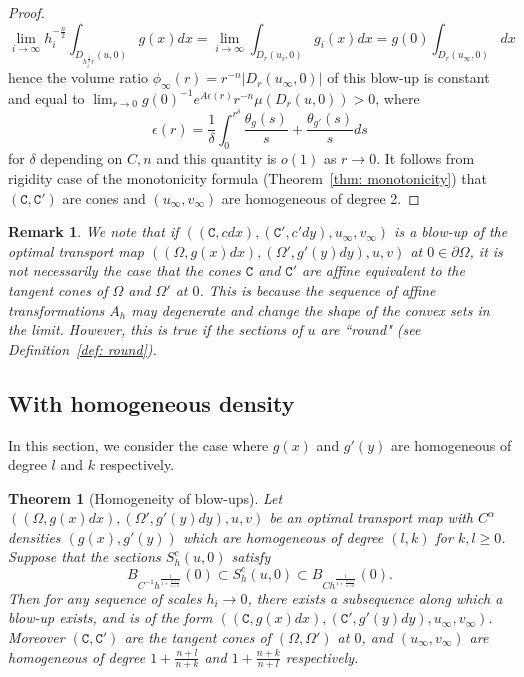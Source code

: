 \documentclass[12pt,reqno]{amsart}
\newtheorem{remark}{Remark}[section]
\newtheorem{theorem}{Theorem}[section]
\numberwithin{equation}{section}
\begin{document}
\begin{proof}
        \[\lim_{i\to \infty}h_i^{-\frac n 2}\int_{D_{h_i^{\frac 1 2}r}(u, 0)}g(x)dx =\lim_{i\to \infty}\int_{D_r(u_i, 0)}g_i(x)dx = g(0)\int_{D_r(u_{\infty}, 0)}dx\]
        hence the volume ratio $\phi_{\infty}(r) = r^{-n}|D_r(u_{\infty}, 0)|$ of this blow-up is constant and equal to $\lim_{r\to 0}g(0)^{-1}e^{A\epsilon (r)}r^{-n}\mu(D_r(u, 0))>0$, where 
        \[
        \epsilon(r) = \frac{1}{\delta}\int_{0}^{r^{\delta}} \frac{\theta_g(s)}{s} +\frac{\theta_{g'}(s)}{s}  ds
        \]
        for $\delta$ depending on $C, n$ and this quantity is $o(1)$ as $r\rightarrow 0$.
        It follows from rigidity case of the monotonicity formula (Theorem~\ref{thm: monotonicity}) that $(\mathtt C, \mathtt C')$ are cones and $(u_{\infty}, v_{\infty})$ are homogeneous of degree 2. 
        \end{proof}

        \begin{remark}
            We note that if $((\mathtt C,cdx), (\mathtt C', c'dy), u_{\infty}, v_{\infty})$ is a blow-up of the optimal transport map $((\Omega, g(x)dx), (\Omega', g'(y)dy), u, v)$ at $0\in \partial\Omega$, it is not necessarily the case that the cones $\mathtt C$ and $\mathtt C'$ are affine equivalent to the tangent cones of $\Omega$ and $\Omega'$ at $0$. This is because the sequence of affine transformations $A_h$ may degenerate and change the shape of the convex sets in the limit. However, this is true if the sections of $u$ are ``round" (see Definition~\ref{def: round}).
        \end{remark}
        \subsection{With homogeneous density}
        In this section, we consider the case where $g(x)$ and $g'(y)$ are homogeneous of degree $l$ and $k$ respectively.  
        \begin{theorem}[Homogeneity of blow-ups]\label{thm: homog-of-blowup-density}
        Let $((\Omega, g(x)dx), (\Omega', g'(y)dy), u, v)$ be an optimal transport map with $C^{\alpha}$ densities $(g(x), g'(y))$ which are homogeneous of degree $(l, k)$ for $k, l\geq 0$. Suppose that the sections $S_h^c(u, 0)$ satisfy
        \[B_{C^{-1}h^{\frac{1}{1+\frac{n+l}{n+k}}}}(0)\subset S_h^c(u, 0)\subset B_{Ch^{\frac{1}{1+\frac{n+l}{n+k}}}}(0).\]
        Then for any sequence of scales $h_i\to 0$, there exists a subsequence along which a blow-up exists, and is of the form $((\mathtt C, g(x)dx), (\mathtt C', g'(y)dy), u_{\infty}, v_{\infty})$. Moreover $(\mathtt C, \mathtt C')$ are the tangent cones of $(\Omega, \Omega')$ at $0$, and $(u_{\infty}, v_{\infty})$ are homogeneous of degree $1+\frac{n+l}{n+k}$ and $1+\frac{n+k}{n+l}$ respectively. 
        \end{theorem}
\end{document}
